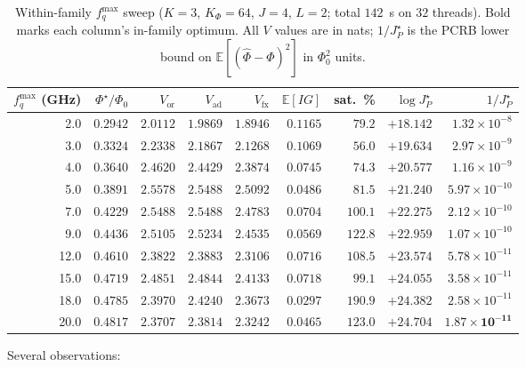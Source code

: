 \documentclass[11pt,a4paper]{article}
\newcommand{\E}{\mathbb{E}}
\newcommand{\Phizero}{\Phi_0}
\begin{document}
\begin{table}[h]
\centering
\caption{Within-family $f_q^{\max}$ sweep ($K=3$, $K_\Phi=64$, $J=4$, $L=2$; total $142$~s on $32$ threads).  Bold marks each column's in-family optimum.  All $V$ values are in nats; $1/J_P^\star$ is the PCRB lower bound on $\E[(\hat\Phi - \Phi)^2]$ in $\Phizero^2$ units.}
\label{tab:fq_sweep}
\begin{tabular}{@{}rrrrrrrrr@{}}
\toprule
$f_q^{\max}$ (GHz) & $\Phi^\star/\Phizero$ & $V_{\text{or}}$ & $V_{\text{ad}}$ & $V_{\text{fx}}$ & $\E[IG]$ & sat.\ \% & $\log J_P^\star$ & $1/J_P^\star$ \\
\midrule
 2.0 & $0.2942$ & $2.0112$ & $1.9869$ & $1.8946$ & $\mathbf{0.1165}$ & $79.2$  & $+18.142$ & $1.32\!\times\!10^{-8}$ \\
 3.0 & $0.3324$ & $2.2338$ & $2.1867$ & $2.1268$ & $0.1069$ & $56.0$  & $+19.634$ & $2.97\!\times\!10^{-9}$ \\
 4.0 & $0.3640$ & $2.4620$ & $2.4429$ & $2.3874$ & $0.0745$ & $74.3$  & $+20.577$ & $1.16\!\times\!10^{-9}$ \\
 5.0 & $0.3891$ & $\mathbf{2.5578}$ & $\mathbf{2.5488}$ & $\mathbf{2.5092}$ & $0.0486$ & $81.5$  & $+21.240$ & $5.97\!\times\!10^{-10}$ \\
 7.0 & $0.4229$ & $2.5488$ & $\mathbf{2.5488}$ & $2.4783$ & $0.0704$ & $100.1$ & $+22.275$ & $2.12\!\times\!10^{-10}$ \\
 9.0 & $0.4436$ & $2.5105$ & $2.5234$ & $2.4535$ & $0.0569$ & $122.8$ & $+22.959$ & $1.07\!\times\!10^{-10}$ \\
12.0 & $0.4610$ & $2.3822$ & $2.3883$ & $2.3106$ & $0.0716$ & $108.5$ & $+23.574$ & $5.78\!\times\!10^{-11}$ \\
15.0 & $0.4719$ & $2.4851$ & $2.4844$ & $2.4133$ & $0.0718$ & $99.1$  & $+24.055$ & $3.58\!\times\!10^{-11}$ \\
18.0 & $0.4785$ & $2.3970$ & $2.4240$ & $2.3673$ & $0.0297$ & $190.9$ & $+24.382$ & $2.58\!\times\!10^{-11}$ \\
20.0 & $0.4817$ & $2.3707$ & $2.3814$ & $2.3242$ & $0.0465$ & $123.0$ & $\mathbf{+24.704}$ & $\mathbf{1.87\!\times\!10^{-11}}$ \\
\bottomrule
\end{tabular}
\end{table}

Several observations:
\end{document}
